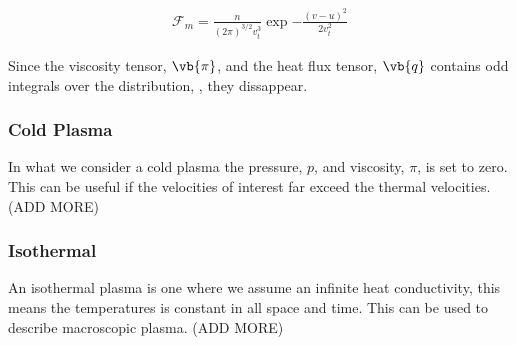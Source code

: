 	\begin{align}
		\mathcal{F}_m = \frac{n}{(2\pi )^{3/2}v_t^3} \exp{-\frac{(v-u)^2}{2v_t^2}}
	\end{align}

	Since the viscosity tensor, \(\vb{\pi}\), and the heat flux tensor, \(\vb{q}\)
	contains odd integrals over the distribution, \textit{},
	they dissappear.

	\subsubsection{Cold Plasma}
	In what we consider a cold plasma the pressure, \(p\), and viscosity, \(\pi\), is set to zero.
	This can be useful if the velocities of interest far exceed the thermal velocities.
	(ADD MORE)


	\subsubsection{Isothermal}
	An isothermal plasma is one where we assume an infinite heat conductivity,
	this means the temperatures is constant in all space and time. This can be used to
	describe macroscopic plasma.
	(ADD MORE)

